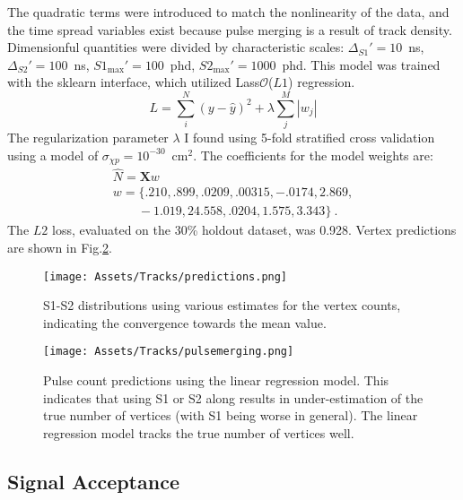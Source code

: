 The quadratic terms were introduced to match the nonlinearity of the data, and the time spread variables exist because pulse merging is a result of track density.
Dimensionful quantities were divided by characteristic scales: $\Delta_{S1}'=10$~ns, $\Delta_{S2}'=100$~ns, $S1_{\text{max}}'=100$~phd, $S2_{\text{max}}'=1000$~phd.
This model was trained with the sklearn interface, which utilized Lass$\mathcal{O}$($L1$) regression.
\begin{equation}
    L = \sum_i^N(y-\hat{y})^2 + \lambda \sum_j^M |w_j| 
\end{equation}
The regularization parameter $\lambda$ I found using 5-fold stratified cross validation using a model of $\sigma_{\chi p} =10^{-30}$~cm$^2$.
The coefficients for the model weights are:
\begin{align}
\hat N = \mathbf{X} w\\
    w = \{.210,  .899,  .0209,  .00315, -.0174,  2.869, \nonumber \\
\qquad -1.019,  24.558, .0204,  1.575,  3.343\}~.
\end{align}
The $L2$ loss, evaluated on the 30\% holdout dataset, was 0.928. 
Vertex predictions are shown in Fig.\ref{fig:pulse_merging}.

\begin{figure}
    \centering
    \texttt{[image: Assets/Tracks/predictions.png]}
    \caption{S1-S2 distributions using various estimates for the vertex counts, indicating the convergence towards the mean value.}
    \label{fig:predictions}
\end{figure}

\begin{figure}
    \centering
    \texttt{[image: Assets/Tracks/pulsemerging.png]}
    \caption[Pulse count predictions using the linear regression model.]%
    {Pulse count predictions using the linear regression model.
    This indicates that using S1 or S2 along results in under-estimation of the true number of vertices (with S1 being worse in general). 
    The linear regression model tracks the true number of vertices well.}
    \label{fig:pulse_merging}
\end{figure}
\subsection{Signal Acceptance}

